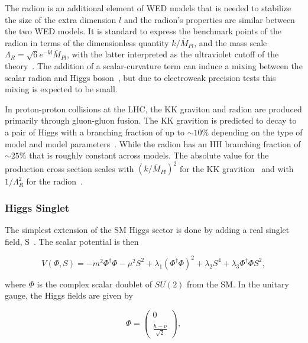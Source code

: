 The radion is an additional element of WED models that is needed to stabilize the size of the extra dimension $l$ and the radion's properties are similar between the two WED models. It is standard to express the benchmark points of the radion in terms of the dimensionless quantity $k/\overline{M}_{Pl}$, and the mass scale $\Lambda_{R} = \sqrt{6} e^{-kl}\overline{M}_{Pl}$, with the latter interpreted as the ultraviolet cutoff of the theory~\cite{WEDuvCutoff}. The addition of a scalar-curvature term can induce a mixing between the scalar radion and Higgs boson~\cite{RadionHMixing}, but due to electroweak precision tests this mixing is expected to be small.

In proton-proton collisions at the LHC, the KK graviton and radion are produced primarily through gluon-gluon fusion. The KK gravition is predicted to decay to a pair of Higgs with a branching fraction of up to ${\sim}10\%$ depending on the type of model and model parameters~\cite{GravitionXS}. While the radion has an HH branching fraction of ${\sim}25\%$ that is roughly constant across models. The absolute value for the production cross section scales with $(k/\overline{M}_{Pl})^{2}$ for the KK gravition~\cite{GravitionXS} and with $1/\Lambda_{R} ^{2}$ for the radion~\cite{RadionXS}. 

\subsubsection{Higgs Singlet}

The simplest extension of the SM Higgs sector is done by adding a real singlet field, S~\cite{HiggsSinglet}. The scalar potential is then

\begin{equation}
V(\Phi,S)= -m^{2}\Phi^{\dag}\Phi -\mu^{2}S^{2}+\lambda_{1}(\Phi^{\dag}\Phi)^{2}+\lambda_{2}S^{4}+\lambda_{3}\Phi^{\dag}\Phi S^{2},
\end{equation}

\noindent
where $\Phi$ is the complex scalar doublet of $SU(2)$ from the SM. In the unitary gauge, the Higgs fields are given by

\begin{equation}
\Phi = 
\begin{pmatrix}
0\\
\frac{\widetilde{h}-\nu}{\sqrt{2}}
\end{pmatrix},
\end{equation}

